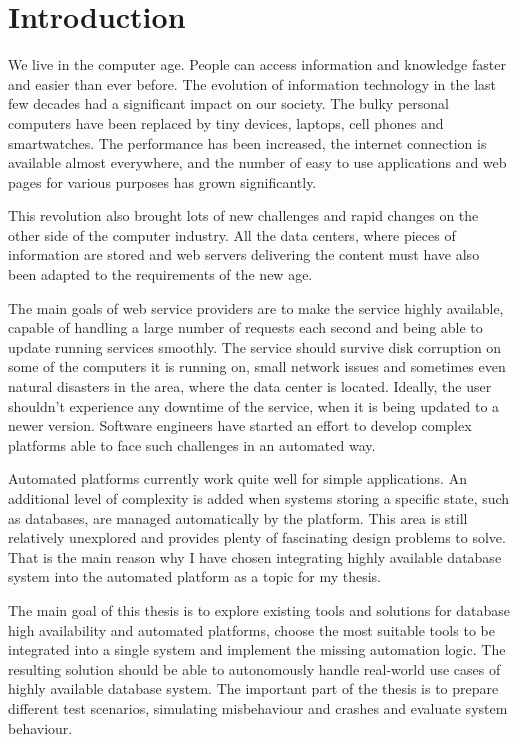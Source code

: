 \documentclass[
  digital, %
  twoside, %
  table,   %
  nolof,   %
  nolot,   %
]{fithesis3}
\begin{document}
\chapter{Introduction}
We live in the computer age. People can access information and knowledge faster and easier than ever before. The evolution of information technology in the last few decades had a significant impact on our society. The bulky personal computers have been replaced by tiny devices, laptops, cell phones and smartwatches. The performance has been increased, the internet connection is available almost everywhere, and the number of easy to use applications and web pages for various purposes has grown significantly.

This revolution also brought lots of new challenges and rapid changes on the other side of the computer industry. All the data centers, where pieces of information are stored and web servers delivering the content must have also been adapted to the requirements of the new age.

The main goals of web service providers are to make the service highly available, capable of handling a large number of requests each second and being able to update running services smoothly. The service should survive disk corruption on some of the computers it is running on, small network issues and sometimes even natural disasters in the area, where the data center is located. Ideally, the user shouldn't experience any downtime of the service, when it is being updated to a newer version. Software engineers have started an effort to develop complex platforms able to face such challenges in an automated way.

Automated platforms currently work quite well for simple applications. An additional level of complexity is added when systems storing a specific state, such as databases, are managed automatically by the platform. This area is still relatively unexplored and provides plenty of fascinating design problems to solve. That is the main reason why I have chosen integrating highly available database system into the automated platform as a topic for my thesis.

The main goal of this thesis is to explore existing tools and solutions for database high availability and automated platforms, choose the most suitable tools to be integrated into a single system and implement the missing automation logic. The resulting solution should be able to autonomously handle real-world use cases of highly available database system. The important part of the thesis is to prepare different test scenarios, simulating misbehaviour and crashes and evaluate system behaviour.
\end{document}
